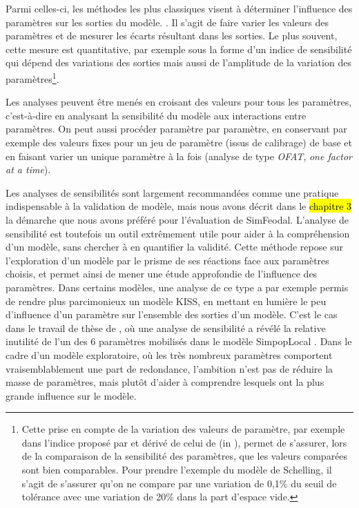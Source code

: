 Parmi celles-ci, les méthodes les plus classiques \autocite[257]{crooks_agent-based_2019} visent à \og déterminer l'influence des paramètres sur les sorties du modèle.\fg{} \autocite[75]{ginot2005explorer}.
Il s'agit de faire varier les valeurs des paramètres et de mesurer les écarts résultant dans les sorties.
Le plus souvent, cette mesure est quantitative, par exemple sous la forme d'un \og indice de sensibilité\fg{} qui dépend des variations des sorties mais aussi de l'amplitude de la variation des paramètres\footnote{
	Cette prise en compte de la variation des valeurs de paramètre, par exemple dans l'indice proposé par \textcite[258]{crooks_agent-based_2019} et dérivé de celui de \textcite{hamby_review_1994} (in \cite[201]{osullivan_spatial_2013}), permet de s'assurer, lors de la comparaison de la sensibilité des paramètres, que les valeurs comparées sont bien comparables.
	Pour prendre l'exemple du modèle de Schelling, il s'agit de s'assurer qu'on ne compare par une variation de 0,1\% du seuil de tolérance avec une variation de 20\% dans la part d'espace vide.
}.

Les analyses peuvent être menés en croisant des valeurs pour tous les paramètres, c'est-à-dire en analysant la sensibilité du modèle aux interactions entre paramètres.
On peut aussi procéder paramètre par paramètre, en conservant par exemple des valeurs fixes pour un jeu de paramètre (issus de calibrage) de base et en faisant varier un unique paramètre à la fois (analyse de type \textit{OFAT}, \og \textit{one factor at a time}\fg{}).

Les analyses de sensibilités sont largement recommandées comme une pratique indispensable à la validation de modèle, mais nous avons décrit dans le \hl{chapitre 3} la démarche que nous avons préféré pour l'évaluation de SimFeodal.
L'analyse de sensibilité est toutefois un outil extrêmement utile pour aider à la compréhension d'un modèle, sans chercher à en quantifier la validité.
Cette méthode repose sur l'exploration d'un modèle par le prisme de ses réactions face aux paramètres choisis, et permet ainsi de mener une étude approfondie de l'influence des paramètres.
Dans certains modèles, une analyse de ce type a par exemple permis de rendre plus parcimonieux un modèle KISS, en mettant en lumière le peu d'influence d'un paramètre sur l'ensemble des sorties d'un modèle.
C'est le cas dans le travail de thèse de , où une analyse de sensibilité a révélé la relative inutilité de l'un des 6 paramètres mobilisés dans le modèle SimpopLocal \autocite[224-225]{schmitt_modelisation_2014}.
Dans le cadre d'un modèle exploratoire, où les très nombreux paramètres comportent vraisemblablement une part de redondance, l'ambition n'est pas de réduire la masse de paramètres, mais plutôt d'aider à comprendre lesquels ont la plus grande influence sur le modèle.


